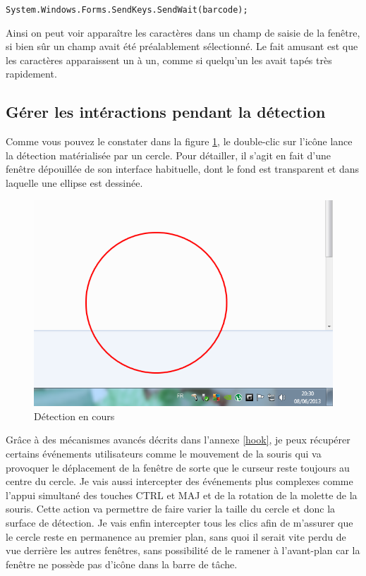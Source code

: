 \verb|System.Windows.Forms.SendKeys.SendWait(barcode);|

Ainsi on peut voir apparaître les caractères dans un champ de saisie de la fenêtre, si bien sûr un champ avait été préalablement sélectionné. Le fait amusant est que les caractères apparaissent un à un, comme si quelqu'un les avait tapés très rapidement.

\subsection{Gérer les intéractions pendant la détection}

Comme vous pouvez le constater dans la figure \ref{detectionRing}, le double-clic sur l'icône lance la détection matérialisée par un cercle. Pour détailler, il s'agit en fait d'une fenêtre dépouillée de son interface habituelle, dont le fond est transparent et dans laquelle une ellipse est dessinée.

\begin{figure}
\begin{center}
\includegraphics[scale=0.5]{images/detector.png}
\end{center}
\caption{Détection en cours}
\label{detectionRing}
\end{figure}

Grâce à des mécanismes avancés décrits dans l'annexe \ref{hook}, je peux récupérer certains événements utilisateurs comme le mouvement de la souris qui va provoquer le déplacement de la fenêtre de sorte que le curseur reste toujours au centre du cercle. Je vais aussi intercepter des événements plus complexes comme l'appui simultané des touches CTRL et MAJ et de la rotation de la molette de la souris. Cette action va permettre de faire varier la taille du cercle et donc la surface de détection. Je vais enfin intercepter tous les clics afin de m'assurer que le cercle reste en permanence au premier plan, sans quoi il serait vite perdu de vue derrière les autres fenêtres, sans possibilité de le ramener à l'avant-plan car la fenêtre ne possède pas d'icône dans la barre de tâche.

